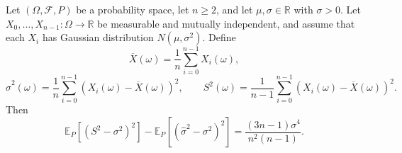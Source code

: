 \begin{theorem}
Let $(\Omega,\mathcal F,P)$ be a probability space, let $n\geq2$, and let
$\mu,\sigma\in\mathbb R$ with $\sigma>0$. Let
$X_0,\ldots,X_{n-1}:\Omega\to\mathbb R$ be measurable and mutually
independent, and assume that each $X_i$ has Gaussian distribution
$N(\mu,\sigma^2)$. Define
\[
 \overline X(\omega)=\frac1n\sum_{i=0}^{n-1}X_i(\omega),
\]
\[
 \widehat\sigma^2(\omega)=\frac1n
 \sum_{i=0}^{n-1}(X_i(\omega)-\overline X(\omega))^2,
 \qquad
 S^2(\omega)=\frac1{n-1}
 \sum_{i=0}^{n-1}(X_i(\omega)-\overline X(\omega))^2.
\]
Then
\[
 \mathbb E_P[(S^2-\sigma^2)^2]
 -\mathbb E_P[(\widehat\sigma^2-\sigma^2)^2]
 =\frac{(3n-1)\sigma^4}{n^2(n-1)}.
\]
\end{theorem}
